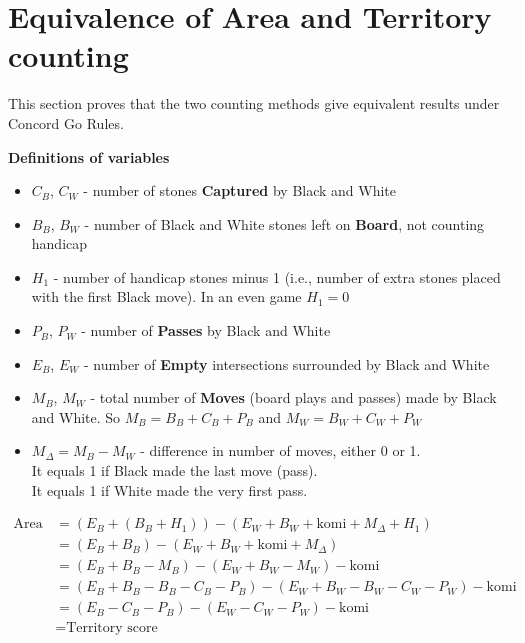 \documentclass[11pt]{article}
\begin{document}
\newpage
\section*{Equivalence of Area and Territory counting}

This section proves that the two counting methods give equivalent results under Concord Go Rules.

\textbf{Definitions of variables}

\begin{itemize}
\item $C_B$, $C_W$ - number of stones \textbf{Captured} by Black and White
\item $B_B$, $B_W$ - number of Black and White stones left on \textbf{Board}, not counting handicap
\item $H_1$ - number of handicap stones minus 1 (i.e., number of extra stones placed with the first Black move).
In an even game $H_1 = 0$
\item $P_B$, $P_W$ - number of \textbf{Passes} by Black and White
\item $E_B$, $E_W$ - number of \textbf{Empty} intersections surrounded by Black and White
\item $M_B$, $M_W$ - total number of \textbf{Moves} (board plays and passes) made by Black and White.
So $M_B = B_B + C_B + P_B$ and $M_W = B_W + C_W + P_W$
\item $M_\Delta = M_B - M_W$ - difference in number of moves, either 0 or 1. \\
It equals 1 if Black made the last move (pass).\\
It equals 1 if White made the very first pass.
\end{itemize}

\begin{align}
\text{Area score} &= (E_B + (B_B+H_1)) - (E_W + B_W + \text{komi} + M_\Delta + H_1) \\
&= (E_B + B_B) - (E_W + B_W + \text{komi} + M_\Delta) \\
&= (E_B + B_B - M_B) - (E_W + B_W - M_W) - \text{komi} \\
&= (E_B + B_B - B_B - C_B - P_B ) - (E_W + B_W - B_W - C_W - P_W) - \text{komi} \\
&= (E_B - C_B - P_B) - (E_W - C_W - P_W) - \text{komi} \\
&= \text{Territory score}
\end{align}
\end{document}
